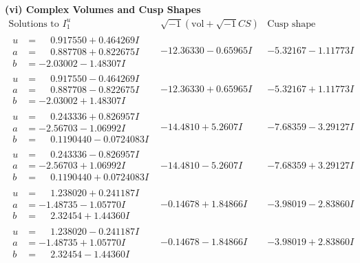 \documentclass[1p]{elsarticle_modified}
\theoremstyle{definition}
\newcommand{\I}{\sqrt{-1}}
\begin{document}
\newpage\flushleft \textbf{(vi) Complex Volumes and Cusp Shapes}
$$\begin{array}{c|c|c}  
\text{Solutions to }I^u_{1}& \I (\text{vol} + \sqrt{-1}CS) & \text{Cusp shape}\\
 \hline 
\begin{aligned}
u &= \phantom{-}0.917550 + 0.464269 I \\
a &= \phantom{-}0.887708 + 0.822675 I \\
b &= -2.03002 - 1.48307 I\end{aligned}
 & -12.36330 - 0.65965 I & -5.32167 - 1.11773 I \\ \hline\begin{aligned}
u &= \phantom{-}0.917550 - 0.464269 I \\
a &= \phantom{-}0.887708 - 0.822675 I \\
b &= -2.03002 + 1.48307 I\end{aligned}
 & -12.36330 + 0.65965 I & -5.32167 + 1.11773 I \\ \hline\begin{aligned}
u &= \phantom{-}0.243336 + 0.826957 I \\
a &= -2.56703 - 1.06992 I \\
b &= \phantom{-}0.1190440 - 0.0724083 I\end{aligned}
 & -14.4810 + 5.2607 I & -7.68359 - 3.29127 I \\ \hline\begin{aligned}
u &= \phantom{-}0.243336 - 0.826957 I \\
a &= -2.56703 + 1.06992 I \\
b &= \phantom{-}0.1190440 + 0.0724083 I\end{aligned}
 & -14.4810 - 5.2607 I & -7.68359 + 3.29127 I \\ \hline\begin{aligned}
u &= \phantom{-}1.238020 + 0.241187 I \\
a &= -1.48735 - 1.05770 I \\
b &= \phantom{-}2.32454 + 1.44360 I\end{aligned}
 & -0.14678 + 1.84866 I & -3.98019 - 2.83860 I \\ \hline\begin{aligned}
u &= \phantom{-}1.238020 - 0.241187 I \\
a &= -1.48735 + 1.05770 I \\
b &= \phantom{-}2.32454 - 1.44360 I\end{aligned}
 & -0.14678 - 1.84866 I & -3.98019 + 2.83860 I \\ \hline\begin{aligned}

\end{aligned}
\end{array}$$
\end{document}
